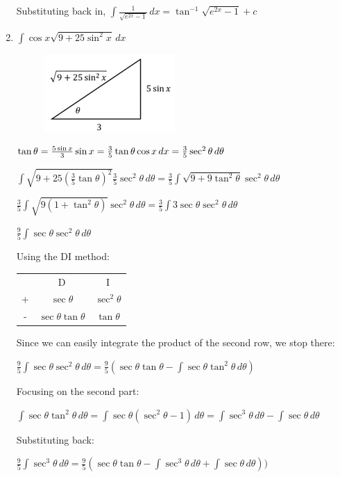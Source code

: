 \documentclass[../main.tex]{subfiles}
\begin{document}
\begin{enumerate}
    Substituting back in, $\int \frac{1}{\sqrt{e^{2x}-1}}\,dx=\tan^{-1}{\sqrt{e^{2x}-1}}+c$

    \item 
    \(\int \cos{x}\sqrt{9+25\sin^2{x}}\,dx\)
    \begin{figure}[h]
        \includegraphics{images/trigsuba11.png}
    \end{figure}

    \(\tan{\theta}=\frac{5\sin{x}}{3}\\
    \sin{x}=\frac{3}{5}\tan{\theta}\\
    \cos{x}\,dx=\frac{3}{5}\sec^2{\theta}\,d\theta\)

    \(\int \sqrt{9+25(\frac{3}{5}\tan{\theta})^2}\frac{3}{5}\sec^2{\theta}\,d\theta=\frac{3}{5}\int \sqrt{9+9\tan^2{\theta}}\sec^2{\theta}\,d\theta\)

    \(\frac{3}{5}\int \sqrt{9(1+\tan^2{\theta})}\sec^2{\theta}\,d\theta=\frac{3}{5}\int 3\sec{\theta}\sec^2{\theta}\,d\theta\)

    \(\frac{9}{5}\int \sec{\theta}\sec^2{\theta}\,d\theta\)

    Using the DI method:

    \begin{tabular}{ c c c }
       & D & I \\ 
     +  & $\sec{\theta}$ &$\sec^2{\theta}$ \\  
     - & $\sec{\theta}\tan{\theta}$ & $\tan{\theta}$\\ 
    \end{tabular}

    Since we can easily integrate the product of the second row, we stop there:

    \(\frac{9}{5}\int \sec{\theta}\sec^2{\theta}\,d\theta=\frac{9}{5}(\sec{\theta}\tan{\theta}-\int \sec{\theta}\tan^2{\theta}\,d\theta)\)

    Focusing on the second part:

    \(\int \sec{\theta}\tan^2{\theta}\,d\theta=\int \sec{\theta}(\sec^2{\theta}-1)\,d\theta=\int \sec^3{\theta}\,d\theta -\int \sec{\theta}\,d\theta\)

    Substituting back:

    \(\frac{9}{5}\int \sec^3{\theta}\,d\theta=\frac{9}{5}(\sec{\theta}\tan{\theta}-\int \sec^3{\theta}\,d\theta +\int \sec{\theta}\,d\theta))\)


\end{enumerate}
\end{document}
